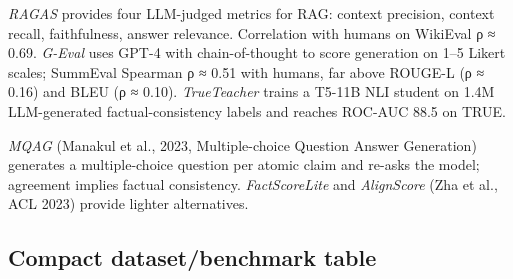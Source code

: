 \documentclass{article}
\begin{document}
\emph{RAGAS} \citep{es2024ragasautomatedeval} provides four LLM-judged metrics for RAG: context precision, context recall, faithfulness, answer relevance. Correlation with humans on WikiEval ρ ≈ 0.69. \emph{G-Eval} \citep{liu2023gevalnlgevaluation} uses GPT-4 with chain-of-thought to score generation on 1--5 Likert scales; SummEval Spearman ρ ≈ 0.51 with humans, far above ROUGE-L (ρ ≈ 0.16) and BLEU (ρ ≈ 0.10). \emph{TrueTeacher} \citep{gekhman2023trueteacherlearnin} trains a T5-11B NLI student on 1.4M LLM-generated factual-consistency labels and reaches ROC-AUC 88.5 on TRUE.

\emph{MQAG} (Manakul et al., 2023, Multiple-choice Question Answer Generation) generates a multiple-choice question per atomic claim and re-asks the model; agreement implies factual consistency. \emph{FactScoreLite} and \emph{AlignScore} (Zha et al., ACL 2023) provide lighter alternatives.

\subsection{Compact dataset/benchmark table}\label{compact-datasetbenchmark-table}
\end{document}
